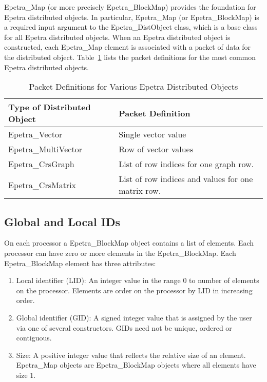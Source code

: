 \documentclass[12pt,relax]{EpetraUserGuide}
\newcommand{\map}{Epetra\_Map}
\newcommand{\blockmap}{Epetra\_BlockMap}
\renewcommand{\vector}{Epetra\_Vector}
\newcommand{\multivector}{Epetra\_MultiVector}
\newcommand{\crsgraph}{Epetra\_CrsGraph}
\newcommand{\crsmatrix}{Epetra\_CrsMatrix}
\newcommand{\distobject}{Epetra\_DistObject}
\begin{document}
\map{} (or more precisely \blockmap{}) provides the foundation for Epetra 
distributed objects.  In particular, \map{} (or \blockmap{}) is a required
input argument to the \distobject{} class, which is a base class for all Epetra
distributed objects.  When an Epetra distributed object is constructed, each \map{}
element is associated with a packet of data for the distributed object.  
Table~\ref{Table:PacketDefinitions} lists the packet definitions for the most
common Epetra distributed objects.
\begin{table}
\begin{center}
\begin{tabular}{ | p{7.5cm} | p{7.5cm} | }
\hline\hline
Type of Distributed Object & Packet Definition \\\hline
\vector{} & Single vector value \\\hline
\multivector{} & Row of vector values \\\hline
\crsgraph{} & List of row indices for one graph row. \\\hline
\crsmatrix{} & List of row indices and values for one matrix row. \\\hline
\hline
\end{tabular}
\caption{Packet Definitions for Various Epetra Distributed Objects}
\label{Table:PacketDefinitions}
\end{center}
\end{table}


\subsection{Global and Local IDs}

On each processor a \blockmap{} object contains a list of elements.  Each
processor can have zero or more elements in the \blockmap.  Each \blockmap{}
element has three attributes:
\begin{enumerate}
\item Local identifier (LID): An integer value in the range 0 to number of elements
on the processor. Elements are order on the processor by LID in increasing order.
\item Global identifier (GID): A signed integer value that is assigned by the user via
one of several constructors.  GIDs need not be unique, ordered or contiguous.
\item Size: A positive integer value that reflects the relative size of an element.  \map{} 
objects are \blockmap{} objects where all elements have size 1.
\end{enumerate}
\end{document}
